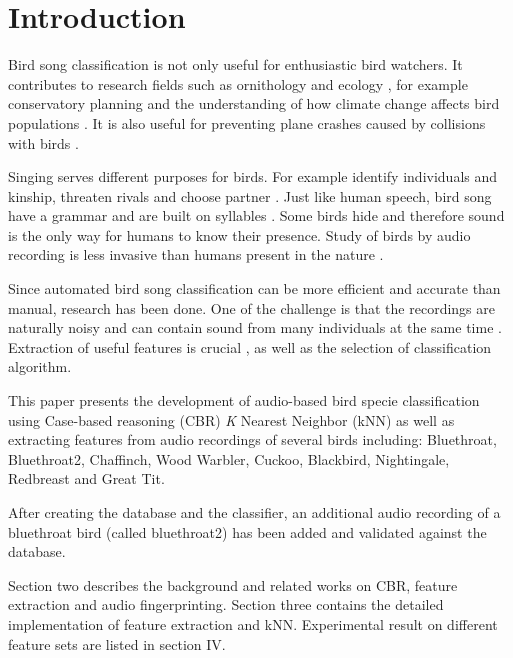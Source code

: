 \section{Introduction}
Bird song classification is not only useful for enthusiastic bird watchers.
It contributes to research fields such as ornithology and ecology \cite{7418412},
for example conservatory planning  \cite{5360230} and the understanding of
how climate change affects bird populations \cite{7418412}.
It is also useful for preventing plane crashes caused by collisions with birds  \cite{5360230}.

Singing serves different purposes for birds. For example identify
individuals and kinship, threaten rivals and choose partner  \cite{7073944}.
Just like human speech, bird song have a grammar and are built on syllables \cite{5360230}.
Some birds hide and therefore sound is the only way for humans to know their presence.
Study of birds by audio recording is less invasive than humans present in the nature \cite{6123334}.

Since automated bird song classification can be more efficient and accurate than manual,
research has been done. One of the challenge is that the recordings are naturally
noisy and can contain sound from many individuals at the same time  \cite{7073944}.
Extraction of useful features is crucial \cite{5360230}, as well as the selection
of classification algorithm.

This paper presents the development of audio-based bird specie classification
using Case-based reasoning (CBR) \textit{K} Nearest Neighbor (kNN) as well as
extracting features from audio recordings of several birds including: Bluethroat,
Bluethroat2, Chaffinch, Wood Warbler, Cuckoo, Blackbird, Nightingale, Redbreast and Great Tit.

After creating the database and the classifier, an additional audio recording
of a bluethroat bird (called bluethroat2) has been added and validated against the database.

Section two describes the background and related works on CBR, feature extraction and audio fingerprinting.
Section three contains the detailed implementation of feature extraction and kNN. Experimental
result on different feature sets are listed in section IV.
